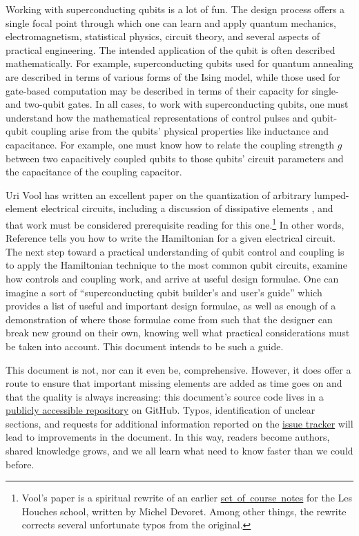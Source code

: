 
Working with superconducting qubits is a lot of fun.
The design process offers a single focal point through which one can learn and apply quantum mechanics, electromagnetism, statistical physics, circuit theory, and several aspects of practical engineering.
The intended application of the qubit is often described mathematically.
For example, superconducting qubits used for quantum annealing are described in terms of various forms of the Ising model, while those used for gate-based computation may be described in terms of their capacity for single- and two-qubit gates.
In all cases, to work with superconducting qubits, one must understand how the mathematical representations of control pulses and qubit-qubit coupling arise from the qubits' physical properties like inductance and capacitance.
For example, one must know how to relate the coupling strength $g$ between two capacitively coupled qubits to those qubits' circuit parameters and the capacitance of the coupling capacitor.

Uri Vool has written an excellent paper on the quantization of arbitrary lumped-element electrical circuits, including a discussion of dissipative elements \cite{Vool:quantumCircuits}, and that work must be considered prerequisite reading for this one.\footnote{Vool's paper is a spiritual rewrite of an earlier \mbox{\href{http://qulab.eng.yale.edu/documents/reprints/Houches_fluctuations.pdf}{set of course notes}} for the Les Houches school, written by Michel Devoret. Among other things, the rewrite corrects several unfortunate typos from the original.}
In other words, Reference \cite{Vool:quantumCircuits} tells you how to write the Hamiltonian for a given electrical circuit.
The next step toward a practical understanding of qubit control and coupling is to apply the Hamiltonian technique to the most common qubit circuits, examine how controls and coupling work, and arrive at useful design formulae.
One can imagine a sort of ``superconducting qubit builder's and user's guide'' which provides a list of useful and important design formulae, as well as enough of a demonstration of where those formulae come from such that the designer can break new ground on their own, knowing well what practical considerations must be taken into account.
This document intends to be such a guide.


This document is not, nor can it even be, comprehensive.
However, it does offer a route to ensure that important missing elements are added as time goes on and that the quality is always increasing: this document's source code lives in a \href{https://github.com/danielsank/theory}{publicly accessible repository} on GitHub.
Typos, identification of unclear sections, and requests for additional information reported on the \href{https://github.com/danielsank/theory/issues}{issue tracker} will lead to improvements in the document.
In this way, readers become authors, shared knowledge grows, and we all learn what need to know faster than we could before.
